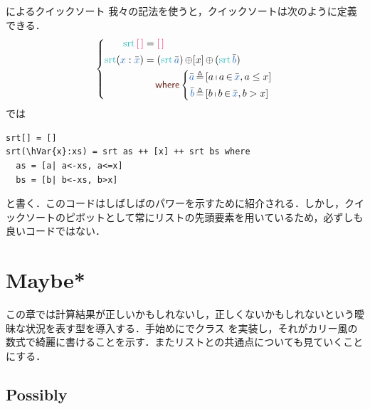 \documentclass[a5paper,twoside,fleqn,draft]{jsbook}
\begin{document}
\begin{note}{\haskell によるクイックソート}
我々の記法を使うと，クイックソートは次のように定義できる．
\begin{equation*}
  \left\{
  \begin{aligned}
    \mSort\mEmptyList
    &=\mEmptyList\\
    \mSort(\hVar{x}:\hListVarWith{x})
    &=(\mSort\hListVarWith{a})\hAppend[x]\hAppend{}(\mSort\hListVarWith{b})\\
    &\quad\mWhere\left\{\begin{aligned}
    \hListVarWith{a}&\mLetEq{}[a\mListComp a\mFrom\hListVarWith{x},a\le x]\\
    \hListVarWith{b}&\mLetEq{}[b\mListComp b\mFrom\hListVarWith{x},b>x]
    \end{aligned}
    \right.
  \end{aligned}
  \right.
\end{equation*}
\haskell では %
\begin{haskellcode}
\begin{verbatim}
srt[] = []
srt(\hVar{x}:xs) = srt as ++ [x] ++ srt bs where
  as = [a| a<-xs, a<=x]
  bs = [b| b<-xs, b>x]
\end{verbatim}
\end{haskellcode}
と書く．このコードはしばしば\haskell のパワーを示すために紹介される．しかし，クイックソートのピボットとして常にリストの先頭要素を用いているため，必ずしも良いコードではない．
\end{note}

\chapter{Maybe*}
\label{ch:maybe}

\begin{leader}
この章では計算結果が正しいかもしれないし，正しくないかもしれないという曖昧な状況を表す型を導入する．手始めに\python でクラス  を実装し，それがカリー風の数式で綺麗に書けることを示す．またリストとの共通点についても見ていくことにする．
\end{leader}

\section{Possibly}
\end{document}
